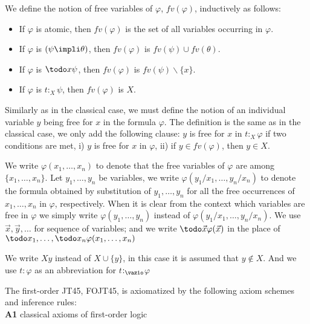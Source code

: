 \begin{defn}
We define the notion of free variables of $\varphi$, $fv(\varphi)$, inductively as follows:

\begin{itemize} 
	\item If $\varphi$ is atomic, then $fv(\varphi)$ is the set of all variables occurring in $\varphi$.
	\item If $\varphi$ is $(\psi \impli \theta)$, then $fv(\varphi)$ is $fv(\psi) \cup fv(\theta)$.
	\item If $\varphi$ is $\todo x \psi$, then $fv(\varphi)$ is $fv(\psi) \backslash \{x\}$.
	\item If $\varphi$ is $t$$:_{X}$$\psi$, then  $fv(\varphi)$ is $X$.
\end{itemize}


\qquad Similarly as in the classical case, we must define the notion of an individual variable $y$ being free for $x$ in the formula $\varphi$. The definition is the same as in the classical case, we only add the following clause: $y$ is free for $x$ in $t$$:_{X}$$\varphi$ if two conditions are met, i) $y$ is free for $x$ in $\varphi$, ii) if $y \in fv(\varphi)$, then $y \in X$.
\end{defn}

\qquad We write $\varphi(x_{1}, \dots, x_{n})$ to denote that the free variables of $\varphi$ are among $\{x_{1}, \dots, x_{n}\}$. Let $y_{1}, \dots, y_{n}$ be variables, we write $\varphi(y_{1}/x_{1}, \dots, y_{n}/x_{n})$ to denote the formula obtained by substitution of $y_{1}, \dots, y_{n}$ for all the free occurrences of $x_{1}, \dots, x_{n}$ in $\varphi$,  respectively. When it is clear from the context which variables are free in $\varphi$ we simply write $\varphi(y_{1}, \dots, y_{n})$ instead of $\varphi(y_{1}/x_{1}, \dots, y_{n}/x_{n})$. We use $\vec{x},\vec{y}, \dots$ for sequence of variables; and we write $\todo \vec{x} \varphi(\vec{x})$ in the place of $\todo x_1, \dots ,\todo x_n\varphi(x_1, \dots ,x_n)$ 


\qquad We write $Xy$ instead of $X \cup \{y\}$, in this case it is assumed that $y \notin X$. And we use $t$$:$$\varphi$ as an abbreviation for $t$$:_{\vazio}$$\varphi$

\qquad  The first-order JT45, FOJT45, is axiomatized by the following axiom schemes and inference rules:\\


\textbf{A1} classical axioms of first-order logic\\

